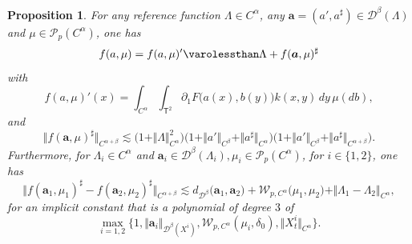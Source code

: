 \documentclass[JEP,XML,SOM,Unicode,published]{cedram}
\newtheorem{prop}[thm]{Proposition}
\theoremstyle{definition}
\newcommand{\mcD}{\mathcal{D}}
\newcommand{\mcP}{\mathcal{P}}
\newcommand\mcW{\mathcal W}
\newcommand{\bsa}{\boldsymbol{a}}
\newcommand{\norme}[1]{\Vert #1 \Vert}
\begin{document}
\begin{prop} \label{paralinearisation0}
For any reference function $\Lambda\in C^\alpha$, any $\bsa=(a',a^\sharp)\in \mcD^{\beta}(\Lambda)$ and $\mu\in \mcP_p(C^\alpha)$, one has
\[
f(a,\mu) = f(a, \mu)' \varolessthan \Lambda + f(\bsa, \mu)^\sharp
\]
with
\[
f(a,\mu)'(x) = \int_{C^\alpha}\int_{\mathsf{T}^2}\partial_1F\bigl(a(x), b(y)\bigr) k(x,y) \, dy \, \mu(db),
\]
and
\[
\norme{f(\bsa, \mu)^\sharp}_{C^{\alpha+\beta}} \lesssim \bigl(1+\norme{\Lambda}^2_{C^\alpha}\bigr) \bigl(1+\norme{a'}_{C^\beta} + \norme{a^\sharp}_{C^\alpha} \bigr) \bigl(1+ \norme{a'}_{C^\beta} + \Vert a^\sharp\Vert_{C^{\alpha+\beta}} \bigr).
\]
Furthermore, for $\Lambda_i\in C^\alpha$ and $\bsa_i\in \mcD^\beta(\Lambda_i), \mu_i\in\mcP_p(C^\alpha)$, for $i\in\{1,2\}$, one has
\begin{equation} \label{EqLipscthizEstimateFUNu1}
\big\Vert f(\bsa_1,\mu_1)^\sharp - f(\bsa_2,\mu_2)^\sharp\big\Vert_{C^{\alpha+\beta}} \lesssim d_{\mcD^\beta}\bigl(\bsa_1, \bsa_2\bigr) + \mcW_{p,C^\alpha}\bigl(\mu_1, \mu_2\bigr) + \Vert \Lambda_1 - \Lambda_2\Vert_{C^\alpha},
\end{equation}
for an implicit constant that is a polynomial of degree $3$ of
\[
\max_{i=1,2}\bigl\{ 1, \Vert \bsa_i\Vert_{\mcD^\beta(X^i)}, \mcW_{p,C^\alpha}(\mu_i,\delta_0), \Vert X_t^i\Vert_{C^\alpha} \bigr\}.
\]
\end{prop}
\end{document}
